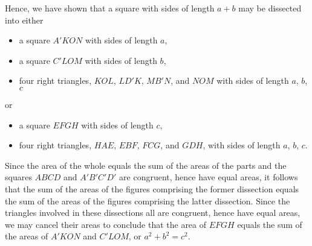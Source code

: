 \documentclass[12pt]{article}
\begin{document}
Hence, we have shown that a square with sides of length $a+b$ may be dissected into
either
\begin{itemize}
\item a square $A'KON$ with sides of length $a$,
\item a square $C'LOM$ with sides of length $b$,
\item four right triangles, $KOL$, $LD'K$, $MB'N$, and
$NOM$ with sides of length $a$, $b$, $c$
\end{itemize}
or
\begin{itemize}
\item a square $EFGH$ with sides of length $c$,
\item four right triangles, $HAE$, $EBF$, $FCG$, and
$GDH$,  with sides of length $a$, $b$, $c$.
\end{itemize}
Since the area of the whole equals the sum of the areas of the parts and the squares
$ABCD$ and $A'B'C'D'$ are congruent, hence have equal areas, it follows that the
sum of the areas of the figures comprising the former dissection equals the sum of the
areas of the figures comprising the latter dissection.  Since the triangles involved in
these dissections all are congruent, hence have equal areas, we may cancel their areas
to conclude that the area of $EFGH$ equals the sum of the areas of $A'KON$ and $C'LOM$,
or $a^2 + b^2 = c^2$.
\end{document}
